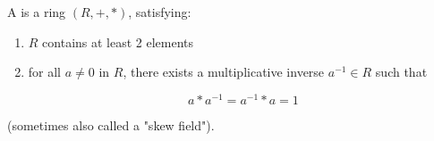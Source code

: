\begin{definition}
    \label{DivisionRing}
    \leanok

    A  is a ring $(R, +, *)$, satisfying:

    \begin{enumerate}

    \item $R$ contains at least 2 elements
    \item for all $a \neq 0$ in $R$, there exists a multiplicative inverse $a^{-1} \in R$ such that
    
    $$
    a * a^{-1} = a^{-1} * a = 1
    $$

    \end{enumerate}

    (sometimes also called a "skew field").

\end{definition}






    





    
